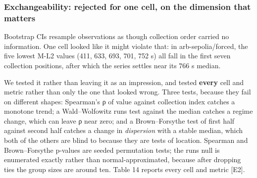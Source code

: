 \documentclass[conference]{IEEEtran}
\renewcommand{\_}{\textunderscore\allowbreak}
\begin{document}
\subsubsection{Exchangeability: rejected for one cell, on the dimension
that
matters}\label{exchangeability-rejected-for-one-cell-on-the-dimension-that-matters}

Bootstrap CIs resample observations as though collection order carried
no information. One cell looked like it might violate that: in
arb-sepolia/forced, the five lowest M-L2 values (411, 633, 693, 701, 752
s) all fall in the first seven collection positions, after which the
series settles near its 766 s median.

We tested it rather than leaving it as an impression, and tested
\textbf{every} cell and metric rather than only the one that looked
wrong. Three tests, because they fail on different shapes: Spearman's ρ
of value against collection index catches a monotone trend; a
Wald--Wolfowitz runs test against the median catches a regime change,
which can leave ρ near zero; and a Brown--Forsythe test of first half
against second half catches a change in \emph{dispersion} with a stable
median, which both of the others are blind to because they are tests of
location. Spearman and Brown--Forsythe p-values are seeded permutation
tests; the runs null is enumerated exactly rather than
normal-approximated, because after dropping ties the group sizes are
around ten. Table 14 reports every cell and metric {[}E2{]}.
\end{document}
